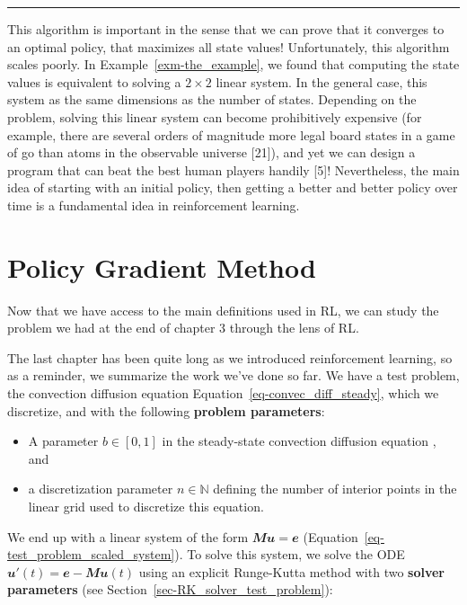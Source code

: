 \documentclass[
  letterpaper,
]{report}
\theoremstyle{plain}
\theoremstyle{definition}
\theoremstyle{definition}
\theoremstyle{remark}
\begin{document}
\begin{center}\rule{0.5\linewidth}{0.5pt}\end{center}

This algorithm is important in the sense that we can prove that it
converges to an optimal policy, that maximizes all state values!
Unfortunately, this algorithm scales poorly. In
Example~\ref{exm-the_example}, we found that computing the state values
is equivalent to solving a \(2\times 2\) linear system. In the general
case, this system as the same dimensions as the number of states.
Depending on the problem, solving this linear system can become
prohibitively expensive (for example, there are several orders of
magnitude more legal board states in a game of go than atoms in the
observable universe {[}21{]}), and yet we can design a program that can
beat the best human players handily {[}5{]}! Nevertheless, the main idea
of starting with an initial policy, then getting a better and better
policy over time is a fundamental idea in reinforcement learning.


\hypertarget{policy-gradient-method}{%
\chapter{Policy Gradient Method}\label{policy-gradient-method}}

Now that we have access to the main definitions used in RL, we can study
the problem we had at the end of chapter 3 through the lens of RL.

The last chapter has been quite long as we introduced reinforcement
learning, so as a reminder, we summarize the work we've done so far. We
have a test problem, the convection diffusion equation
Equation~\ref{eq-convec_diff_steady}, which we discretize, and with the
following \textbf{problem parameters}:

\begin{itemize}
\item
  A parameter \(b \in [0,1]\) in the steady-state convection diffusion
  equation , and
\item
  a discretization parameter \(n\in\mathbb{N}\) defining the number of
  interior points in the linear grid used to discretize this equation.
\end{itemize}

We end up with a linear system of the form
\(\mathbfit{Mu} = \mathbfit{e}\)
(Equation~\ref{eq-test_problem_scaled_system}). To solve this system, we
solve the ODE \(\mathbfit{u}'(t) = \mathbfit{e} - \mathbfit{Mu}(t)\)
using an explicit Runge-Kutta method with two \textbf{solver parameters}
(see Section~\ref{sec-RK_solver_test_problem}):
\end{document}
